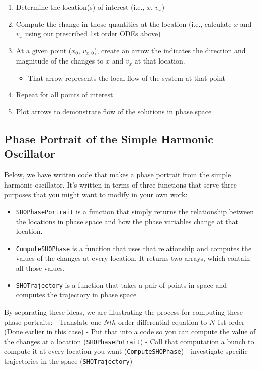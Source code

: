 \begin{enumerate}
\def\labelenumi{\arabic{enumi}.}
\tightlist
\item
  Determine the location(s) of interest (i.e., \(x\), \(v_x\))
\item
  Compute the change in those quantities at the location (i.e.,
  calculate \(\dot{x}\) and \(\dot{v}_x\) using our prescribed 1st order
  ODEs above)
\item
  At a given point (\(x_0\), \(v_{x,0}\)), create an arrow the indicates
  the direction and magnitude of the changes to \(x\) and \(v_x\) at
  that location.

  \begin{itemize}
  \tightlist
  \item
    That arrow represents the local flow of the system at that point
  \end{itemize}
\item
  Repeat for all points of interest
\item
  Plot arrows to demonstrate flow of the solutions in phase space
\end{enumerate}

\subsection{Phase Portrait of the Simple Harmonic
Oscillator}\label{phase-portrait-of-the-simple-harmonic-oscillator}

Below, we have written code that makes a phase portrait from the simple
harmonic oscillator. It's written in terms of three functions that serve
three purposes that you might want to modify in your own work:

\begin{itemize}
\tightlist
\item
  \texttt{SHOPhasePortrait} is a function that simply returns the
  relationship between the locations in phase space and how the phase
  variables change at that location.
\item
  \texttt{ComputeSHOPhase} is a function that uses that relationship and
  computes the values of the changes at every location. It returns two
  arrays, which contain all those values.
\item
  \texttt{SHOTrajectory} is a function that takes a pair of points in
  space and computes the trajectory in phase space
\end{itemize}

By separating these ideas, we are illustrating the process for computing
these phase portraits: - Translate one \(Nth\) order differential
equation to \(N\) 1st order (Done earlier in this case) - Put that into
a code so you can compute the value of the changes at a location
(\texttt{SHOPhasePotrait}) - Call that computation a bunch to compute it
at every location you want (\texttt{ComputeSHOPhase}) - investigate
specific trajectories in the space (\texttt{SHOTrajectory})

